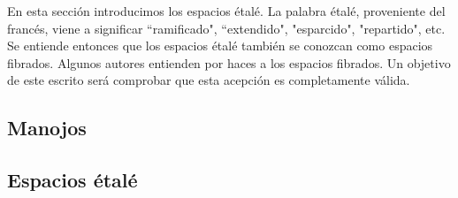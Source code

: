 En esta sección introducimos los espacios étalé. La palabra étalé, proveniente del francés, viene a significar ``ramificado", ``extendido", "esparcido", "repartido", etc. Se entiende entonces que los espacios étalé también se conozcan como espacios fibrados. Algunos autores entienden por haces a los espacios fibrados. Un objetivo de este escrito será comprobar que esta acepción es completamente válida.
\subsection{Manojos}
   
\subsection{Espacios étalé}
   

